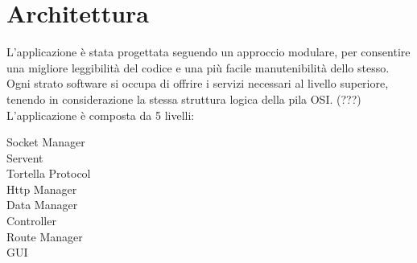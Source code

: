 \chapter{Architettura}
L'applicazione è stata progettata seguendo un approccio modulare, per consentire una migliore leggibilità del codice e una più facile manutenibilità dello stesso. Ogni strato software si occupa di offrire i servizi necessari al livello superiore, tenendo in considerazione la stessa struttura logica della pila OSI. (???)
L'applicazione è composta da 5 livelli:
\begin{description}
\item[Socket Manager]
\item[Servent]
\item[Tortella Protocol]
\item[Http Manager]
\item[Data Manager]
\item[Controller]
\item[Route Manager]
\item[GUI]
\end{description}	